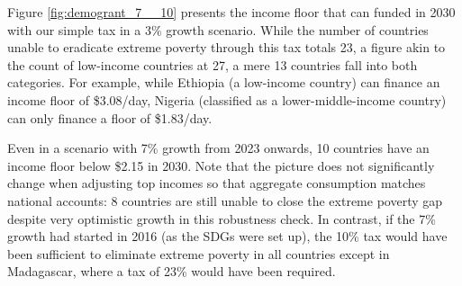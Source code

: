 Figure \ref{fig:demogrant_7__10} presents the income floor that can funded in 2030 with our simple tax in a 3\% growth scenario. While the number of countries unable to eradicate extreme poverty through this tax totals 23, a figure akin to the count of low-income countries at 27, a mere 13 countries fall into both categories.
For example, while Ethiopia (a low-income country) can finance an income floor of \$3.08/day, Nigeria (classified as a lower-middle-income country) can only finance a floor of \$1.83/day. 

Even in a scenario with 7\% growth from 2023 onwards, 10 countries have an income floor below \$2.15 in 2030. Note that the picture does not significantly change when adjusting top incomes so that aggregate consumption matches national accounts: %
8 countries are still unable to close the extreme poverty gap despite very optimistic growth in this robustness check. In contrast, if the 7\% growth had started in 2016 (as the SDGs were set up), the 10\% tax would have been sufficient to eliminate extreme poverty in all countries except in Madagascar, where a tax of 23\% would have been required.

